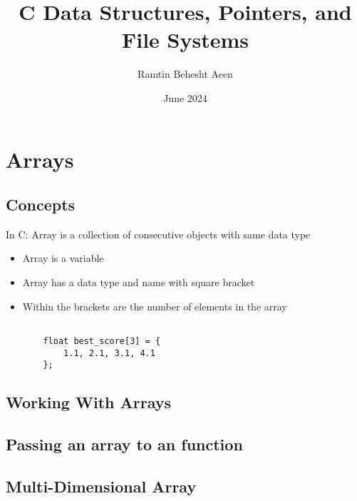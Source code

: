 \documentclass{article}
\title{C Data Structures, Pointers, and File Systems}
\author{Ramtin Behesht Aeen}
\date{June 2024}
\begin{document}
\maketitle

\section{Arrays}
\subsection{Concepts}

In C: Array is a collection of consecutive objects with same data type
\begin{itemize}
    \item Array is a variable
    \item Array has a data type and name with square bracket
    \item Within the brackets are the number of elements in the array

    \begin{lstlisting}
        
    float best_score[3] = {
        1.1, 2.1, 3.1, 4.1
    };

    \end{lstlisting}

\end{itemize}    
   
    
    
    


\subsection{Working With Arrays}
\subsection{Passing an array to an function}
\subsection{Multi-Dimensional Array}
\end{document}
